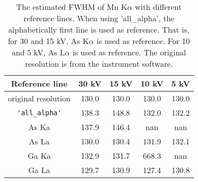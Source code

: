 \begin{table}[p]
    \centering
    \caption{
        The estimated FWHM of Mn K$\alpha$ with different reference lines.
        When using 'all\_alpha', the alphabetically first line is used as reference.
        That is, for 30 and 15 kV, As K$\alpha$ is used as reference.
        For 10 and 5 kV, As L$\alpha$ is used as reference.
        The original resolution is from the instrument software.
    }
    \label{tab:results:estimated-FWHM}
    \begin{tabular}{ccccc}
        Reference line      & 30 kV & 15 kV & 10 kV & 5 kV  \\
        \hline
        original resolution & 130.0 & 130.0 & 130.0 & 130.0 \\
        \verb|'all_alpha'|  & 138.3 & 148.8 & 132.0 & 132.2 \\
        As Ka               & 137.9 & 146.4 & nan   & nan   \\
        As La               & 130.0 & 130.4 & 131.9 & 132.1 \\
        Ga Ka               & 132.9 & 131.7 & 668.3 & nan   \\
        Ga La               & 129.7 & 130.9 & 127.4 & 130.8
    \end{tabular}
\end{table}